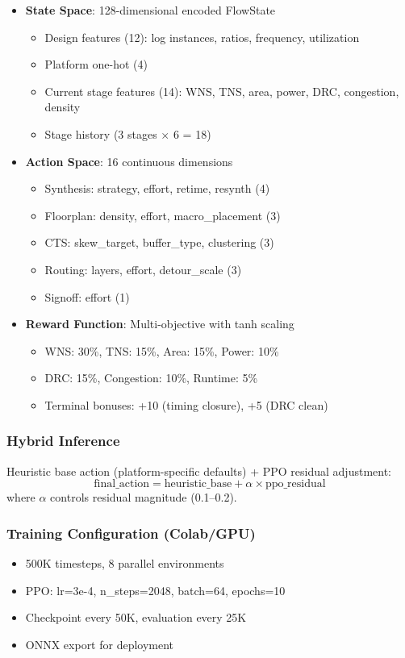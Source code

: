 \documentclass[10pt,conference]{IEEEtran}
\begin{document}
\begin{itemize}
    \item \textbf{State Space}: 128-dimensional encoded FlowState
    \begin{itemize}
        \item Design features (12): log instances, ratios, frequency, utilization
        \item Platform one-hot (4)
        \item Current stage features (14): WNS, TNS, area, power, DRC, congestion, density
        \item Stage history (3 stages $\times$ 6 = 18)
    \end{itemize}
    \item \textbf{Action Space}: 16 continuous dimensions
    \begin{itemize}
        \item Synthesis: strategy, effort, retime, resynth (4)
        \item Floorplan: density, effort, macro\_placement (3)
        \item CTS: skew\_target, buffer\_type, clustering (3)
        \item Routing: layers, effort, detour\_scale (3)
        \item Signoff: effort (1)
    \end{itemize}
    \item \textbf{Reward Function}: Multi-objective with tanh scaling
    \begin{itemize}
        \item WNS: 30\%, TNS: 15\%, Area: 15\%, Power: 10\%
        \item DRC: 15\%, Congestion: 10\%, Runtime: 5\%
        \item Terminal bonuses: +10 (timing closure), +5 (DRC clean)
    \end{itemize}
\end{itemize}

\subsubsection{Hybrid Inference}
Heuristic base action (platform-specific defaults) + PPO residual adjustment:
\begin{equation}
\text{final\_action} = \text{heuristic\_base} + \alpha \times \text{ppo\_residual}
\end{equation}
where $\alpha$ controls residual magnitude (0.1--0.2).

\subsubsection{Training Configuration (Colab/GPU)}
\begin{itemize}
    \item 500K timesteps, 8 parallel environments
    \item PPO: lr=3e-4, n\_steps=2048, batch=64, epochs=10
    \item Checkpoint every 50K, evaluation every 25K
    \item ONNX export for deployment
\end{itemize}
\end{document}
